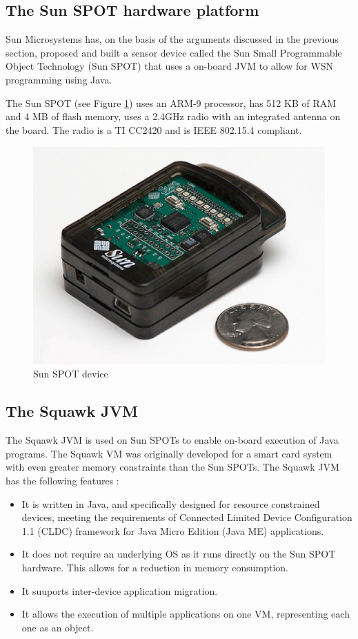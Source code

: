 \subsection{The Sun SPOT hardware platform }
Sun Microsystems has, on the basis of the arguments discussed in the previous
section, proposed and built a sensor device
called the Sun Small Programmable Object Technology (Sun SPOT) that uses a
on-board JVM to allow for WSN programming using Java.

The Sun SPOT (see Figure \ref{Fig:SunSpot}) uses an ARM-9 processor, has 512 KB of RAM
and 4 MB of flash memory, uses a 2.4GHz radio with an integrated antenna on the board. The radio
is a TI CC2420 and is IEEE 802.15.4 compliant.

\begin{figure} 
\centering
\includegraphics[scale=0.50]{img/sunspot1.eps} 
\caption[Sun SPOT device]{Sun SPOT device}
\label{Fig:SunSpot}
\end{figure} 


\subsection{The Squawk JVM}

The Squawk JVM is used on Sun SPOTs to enable on-board execution of Java
programs. The Squawk VM was originally developed for a smart card system with
even greater memory constraints than the Sun SPOTs. The Squawk JVM has the
following features \cite{simon_squawk:2006}:

\begin{itemize}
  \item It is written in Java, and specifically designed for resource
  constrained devices, meeting the requirements of Connected Limited Device
  Configuration 1.1 (CLDC) framework for Java Micro Edition (Java ME)
  applications.
  \item It does not require an underlying OS as it runs directly on the Sun
  SPOT hardware. This allows for a reduction in memory consumption.
  \item It suuports inter-device application migration.
  \item It allows the execution of multiple applications on one VM,
  representing each one as an object.
\end{itemize}

